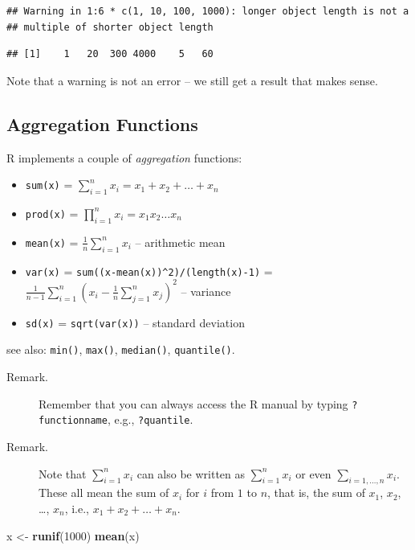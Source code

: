 \documentclass[10pt,b5paper,krantz1]{krantz}
\newenvironment{Shaded}{\begin{snugshade}}{\end{snugshade}}
\newcommand{\DecValTok}[1]{\textcolor[rgb]{0.06,0.06,0.06}{#1}}
\newcommand{\KeywordTok}[1]{\textcolor[rgb]{0.27,0.27,0.27}{\textbf{#1}}}
\newcommand{\NormalTok}[1]{#1}
\newcommand{\StringTok}[1]{\textcolor[rgb]{0.5,0.5,0.5}{#1}}
\providecommand{\tightlist}{%
  \setlength{\itemsep}{0pt}\setlength{\parskip}{0pt}}
\begin{document}
\begin{verbatim}
## Warning in 1:6 * c(1, 10, 100, 1000): longer object length is not a
## multiple of shorter object length
\end{verbatim}

\begin{verbatim}
## [1]    1   20  300 4000    5   60
\end{verbatim}

Note that a warning is not an error -- we still get a result
that makes sense.

\hypertarget{aggregation-functions}{%
\subsection{Aggregation Functions}\label{aggregation-functions}}

R implements a couple of \emph{aggregation} functions:

\begin{itemize}
\tightlist
\item
  \texttt{sum(x)} = \(\sum_{i=1}^n x_i=x_1+x_2+\dots+x_n\)
\item
  \texttt{prod(x)} = \(\prod_{i=1}^n x_i=x_1 x_2 \dots x_n\)
\item
  \texttt{mean(x)} = \(\frac{1}{n}\sum_{i=1}^n x_i\) -- arithmetic mean
\item
  \texttt{var(x)} = \texttt{sum((x-mean(x))\^{}2)/(length(x)-1)} =
  \(\frac{1}{n-1} \sum_{i=1}^n \left(x_i - \frac{1}{n}\sum_{j=1}^n x_j \right)^2\)
  -- variance
\item
  \texttt{sd(x)} = \texttt{sqrt(var(x))} -- standard deviation
\end{itemize}

see also: \texttt{min()}, \texttt{max()}, \texttt{median()}, \texttt{quantile()}.

\begin{description}
\item[Remark.]
Remember that you can always access the R manual by typing
\texttt{?functionname}, e.g., \texttt{?quantile}.
\item[Remark.]
Note that \(\sum_{i=1}^n x_i\) can also be written
as \(\displaystyle\sum_{i=1}^n x_i\) or even \(\displaystyle\sum_{i=1,\dots,n} x_i\).
These all mean the sum of \(x_i\) for \(i\) from \(1\) to \(n\),
that is, the sum of \(x_1\), \(x_2\), \ldots{}, \(x_n\),
i.e.,
\(x_1+x_2+\dots+x_n\).
\end{description}

\begin{Shaded}
\begin{Highlighting}[]
\NormalTok{x <-}\StringTok{ }\KeywordTok{runif}\NormalTok{(}\DecValTok{1000}\NormalTok{)}
\KeywordTok{mean}\NormalTok{(x)}
\end{Highlighting}
\end{Shaded}
\end{document}
